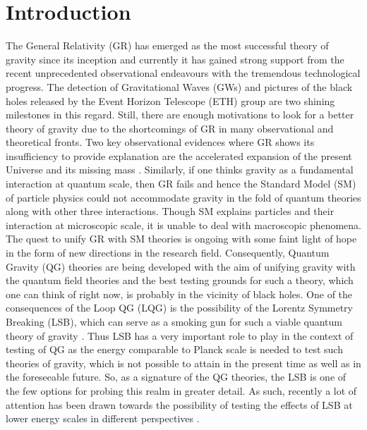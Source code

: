 \documentclass[aps,amsmath,amssymb,showpacs,showkeys]{revtex4}
\begin{document}
\section{Introduction}
\label{sec1}
The General Relativity (GR) has emerged as the most successful theory of 
gravity since its inception and currently it has gained strong support from 
the recent unprecedented observational endeavours with the tremendous 
technological progress. The detection of Gravitational Waves (GWs) 
\cite{1,2,3,4,5} and pictures of the black holes released by the Event Horizon 
Telescope (ETH) group \cite{6,7,8,9,10,11} are two shining milestones in this 
regard. Still, there are enough motivations to look for a better theory of 
gravity due to the shortcomings of GR in many observational and theoretical 
fronts. Two key observational evidences where GR shows its insufficiency to 
provide explanation are the accelerated expansion of the present Universe and 
its missing mass \cite{12,13,14,15,16}. Similarly, if one thinks gravity as a 
fundamental interaction at quantum scale, then GR fails and hence the Standard 
Model (SM) of particle physics could not accommodate gravity in the fold 
of quantum theories along with other three interactions. Though SM explains 
particles and their interaction at microscopic scale, it is unable to deal with 
macroscopic phenomena. The quest to unify GR with SM theories is ongoing with 
some faint light of hope in the form of new directions in the research field. 
Consequently, Quantum Gravity (QG) theories \cite{q1,q2} are being developed 
with the aim of unifying gravity with the quantum field theories and the best 
testing grounds for such a theory, which one can think of right now, is 
probably in the vicinity of black holes. One of the consequences of the Loop 
QG (LQG) \cite{q3,q4} is the possibility of the Lorentz Symmetry Breaking 
(LSB), which can serve as a smoking gun for such a viable quantum theory of 
gravity \cite{18,20}. Thus LSB has a very important role to play in the context
of testing of QG as the energy comparable to Planck scale is needed to test 
such theories of gravity, which is not possible to attain in the present time 
as well as in the foreseeable future. So, as a signature of the QG theories,
the LSB is one of the few options for probing this realm in greater detail. 
As such, recently a lot of attention has been drawn towards the possibility of 
testing the effects of LSB at lower energy scales in different perspectives 
\cite{17,18,19,20,20-1,20-2,20-3,20-4}. 
\end{document}
